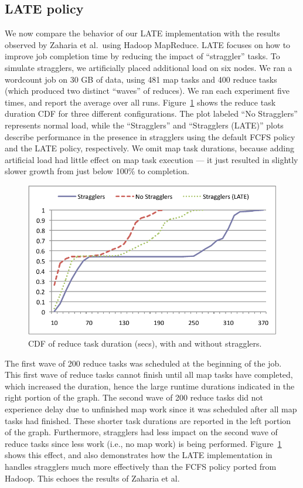 \subsection{LATE policy}

We now compare the behavior of our LATE implementation with the results observed
by Zaharia et al.\ using Hadoop MapReduce. LATE focuses on how to improve job completion time by reducing the impact of
``straggler'' tasks. To simulate stragglers, we artificially placed additional
load on six nodes. We ran a wordcount job on 30 GB of data, using 481 map tasks
and 400 reduce tasks (which produced two distinct ``waves'' of reduces). We ran
each experiment five times, and report the average over all
runs. Figure~\ref{fig:ec2reduce} shows the reduce task duration CDF for three
different configurations. The plot labeled ``No Stragglers'' represents normal
load, while the ``Stragglers'' and ``Stragglers (LATE)'' plots describe
performance in the presence in stragglers using the default FCFS policy and the
LATE policy, respectively. We omit map task durations, because adding artificial
load had little effect on map task execution --- it just resulted in slightly
slower growth from just below 100\% to completion.

\begin{figure}
\ssp
  \centering
  \includegraphics[scale=0.75]{figures/reduce_stragglers}
  \caption{CDF of reduce task duration (secs), with and without stragglers.}
  \label{fig:ec2reduce}
\end{figure}

The first wave of 200 reduce tasks was scheduled at the beginning of the
job. This first wave of reduce tasks cannot finish until all map tasks have
completed, which increased the duration, hence the large runtime durations indicated in the right
portion of the graph. The second wave of 200 reduce tasks did not experience
delay due to unfinished map work since it was scheduled after all map tasks had
finished. These shorter task durations are reported in the left portion of the
graph. Furthermore, stragglers had less impact on the second wave of reduce
tasks since less work (i.e., no map work) is being performed. Figure~\ref{fig:ec2reduce} 
shows this effect, and also demonstrates how the LATE implementation in {\BOOMA} 
handles stragglers much more effectively than the FCFS policy ported from Hadoop.  
This echoes the results of Zaharia et al.~\cite{late-sched}

